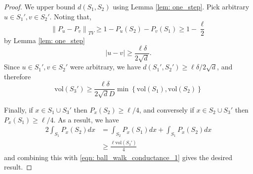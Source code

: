 \documentclass{article}
\newcommand{\norm}[1]{\left\lVert#1\right\rVert}
\newcommand{\abs}[1]{\left \lvert #1 \right \rvert}
\newcommand{\vol}{\mathrm{vol}}
\newcommand{\set}[1]{\left\{#1\right\}}
\newcommand{\1}{\mathbf{1}}
\theoremstyle{alden}
\theoremstyle{aldenthm}
\theoremstyle{remark}
\begin{document}
\begin{proof}
	We upper bound $d(S_1, S_2)$ using Lemma \ref{lem: one_step}. Pick arbitrary $u \in S_1', v \in S_2'$. Noting that, 
	\begin{equation*}
	\norm{P_u - P_v}_{TV} \geq 1 - P_u(S_2) - P_v(S_1) \geq 1 - \frac{\ell}{2}
	\end{equation*}
	by Lemma \ref{lem: one_step}
	\begin{equation*}
	\abs{u - v} \geq \frac{\ell \delta}{2 \sqrt{d}}.
	\end{equation*}
	Since $u \in S_1', v \in S_2'$ were arbitrary, we have $d(S_1',S_2') \geq \ell \delta / 2 \sqrt{d}$, and therefore
	\begin{equation}
	\label{eqn: ball_walk_conductance_1}
	\vol(S_3') \geq \frac{\ell \delta}{2 \sqrt{d} D} \min\set{\vol(S_1), \vol(S_2)}
	\end{equation}
	
	Finally, if $x \in S_1 \cup S_3'$ then $P_x(S_2) \geq \ell/4$, and conversely if $x \in S_2 \cup S_3'$ then $P_x(S_1) \geq \ell/4$. As a result, we have
	\begin{align*}
	2 \int_{S_1} P_x(S_2) dx & = \int_{S_2} P_x(S_1) dx + \int_{S_1} P_x(S_2) dx \\
	& \geq \frac{\ell \vol(S_3')}{4}
	\end{align*}
	and combining this with \eqref{eqn: ball_walk_conductance_1} gives the desired result.
\end{proof}
\end{document}
